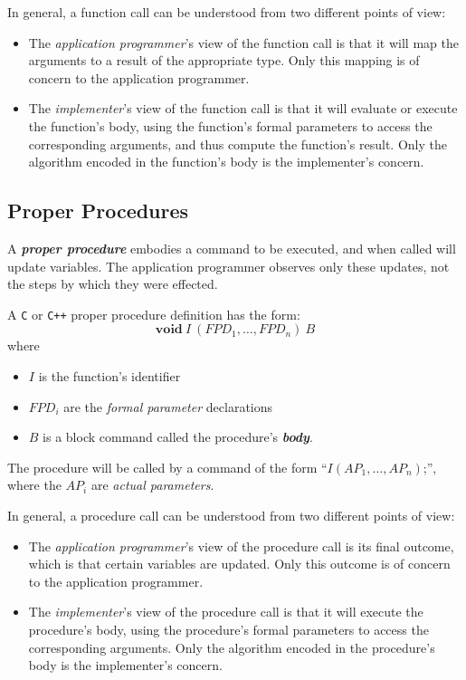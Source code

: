 In general, a function call can be understood from two different points of view:
\begin{itemize}
  \item The \textit{application programmer}'s view of the function call is that it will map the arguments to a result of the appropriate type. Only this mapping is of concern to the application programmer.
  \item The \textit{implementer}'s view of the function call is that it will evaluate or execute the function's body, using the function's formal parameters to access the corresponding arguments, and thus compute the function's result. Only the algorithm encoded in the function's body is the implementer's concern.
\end{itemize}


\subsection{Proper Procedures}

A \textit{\textbf{proper procedure}} embodies a command to be executed, and when called will update variables. The application programmer observes only these updates, not the steps by which they were effected.

A \texttt{C} or \texttt{C++} proper procedure definition has the form:
\begin{equation*}
  \textbf{void}\ I\ (FPD_1, \ldots, FPD_n)\ B
\end{equation*}
where
\begin{itemize}
  \item $I$ is the function's identifier
  \item $FPD_i$ are the \textit{formal parameter} declarations
  \item $B$ is a block command called the procedure's \textit{\textbf{body}}.
\end{itemize}
The procedure will be called by a command of the form ``$I(AP_1, \ldots, AP_n)$;'', where the $AP_i$ are \textit{actual parameters}.

\vspace*{\fill}
\columnbreak

In general, a procedure call can be understood from two different points
of view:
\begin{itemize}
  \item The \textit{application programmer}'s view of the procedure call is its final outcome, which is that certain variables are updated. Only this outcome is of concern to the application programmer.
  \item The \textit{implementer}'s view of the procedure call is that it will execute the procedure's body, using the procedure's formal parameters to access the corresponding arguments. Only the algorithm encoded in the procedure's body is the implementer's concern.
\end{itemize}


